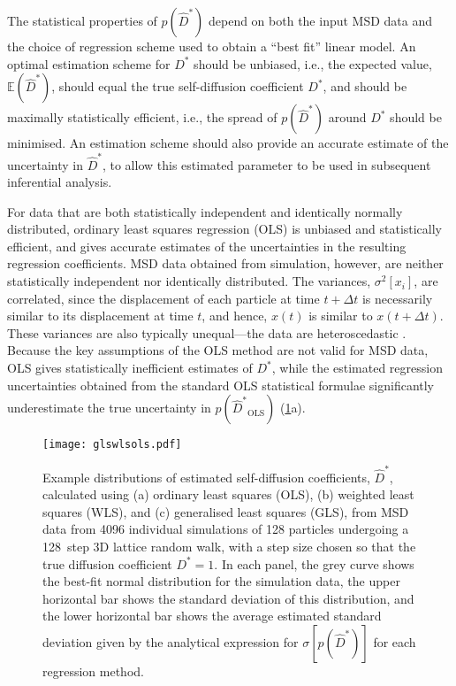 \documentclass[reprint,superscriptaddress,nobibnotes,amsmath,amssymb,aps,prx,hidelinks]{revtex4-2}
\newcommand{\oMSDs}[1]{\ensuremath{x}(#1)}
\newcommand{\oMSDi}{\ensuremath{x_i}}
\newcommand{\prob}[1]{\ensuremath{p(#1)}}
\newcommand{\Dest}{\ensuremath{\widehat{D}^*}}
\newcommand{\D}{\ensuremath{D^*}}
\newcommand{\var}[1]{\ensuremath{\sigma^2[#1]}}
\begin{document}
The statistical properties of $p(\Dest)$ depend on both the input MSD data and the choice of regression scheme used to obtain a ``best fit'' linear model.
An optimal estimation scheme for $\D$ should be unbiased, i.e., the expected value, $\mathbb{E}(\Dest)$, should equal the true self-diffusion coefficient $\D$, and should be maximally statistically efficient, i.e., the spread of $p(\Dest)$ around $\D$ should be minimised.
An estimation scheme should also provide an accurate estimate of the uncertainty in $\Dest$, to allow this estimated parameter to be used in subsequent inferential analysis.

For data that are both statistically independent and identically normally distributed, ordinary least squares regression (OLS) is unbiased and statistically efficient, and gives accurate estimates of the uncertainties in the resulting regression coefficients.
MSD data obtained from simulation, however, are neither statistically independent nor identically distributed.
The variances, $\var{\oMSDi}$, are correlated, since the displacement of each particle at time $t+\Delta t$ is necessarily similar to its displacement at time $t$, and hence, $\oMSDs{t}$ is similar to $\oMSDs{t+\Delta t}$.
These variances are also typically unequal---the data are heteroscedastic \cite{smith_random_1996,he_statistical_2018,UslerEtAl_JComputChem2023}. 
Because the key assumptions of the OLS method are not valid for MSD data, OLS gives statistically inefficient estimates of $\D$, while the estimated regression uncertainties obtained from the standard OLS statistical formulae significantly underestimate the true uncertainty in $\prob{\Dest_\mathrm{OLS}}$ (\cref{fig:glswlsols}a).

\begin{figure}
    \centering
    \texttt{[image: glswlsols.pdf]}
    \caption{
        Example distributions of estimated self-diffusion coefficients, $\Dest$, calculated using (a) ordinary least squares (OLS), (b) weighted least squares (WLS), and (c) generalised least squares (GLS),
        from MSD data from \num{4096} individual simulations of \num{128} particles undergoing a \SI{128}{step} 3D lattice random walk, with a step size chosen so that the true diffusion coefficient $\D = 1$.
        In each panel, the grey curve shows the best-fit normal distribution for the simulation data, the upper horizontal bar shows the standard deviation of this distribution, and the lower horizontal bar shows the average estimated standard deviation given by the analytical expression for $\sigma[\prob{\Dest}]$ for each regression method.}
    \label{fig:glswlsols}
\end{figure}
\end{document}
